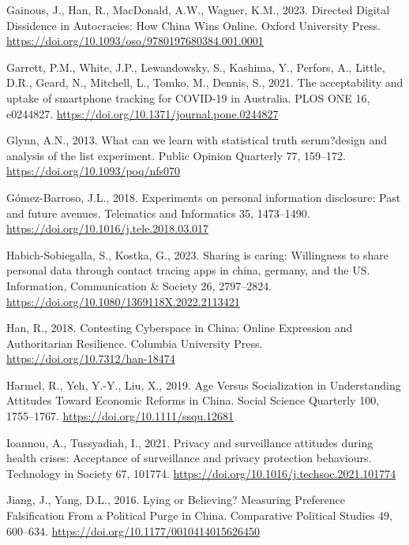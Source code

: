 \documentclass[
  letterpaper,
  DIV=11,
  numbers=noendperiod]{scrartcl}
\newlength{\cslhangindent}
\newenvironment{CSLReferences}[2] %
 {\begin{list}{}{%
  \setlength{\itemindent}{0pt}
  \setlength{\leftmargin}{0pt}
  \setlength{\parsep}{0pt}
  \ifodd #1
   \setlength{\leftmargin}{\cslhangindent}
   \setlength{\itemindent}{-1\cslhangindent}
  \fi
  \setlength{\itemsep}{#2\baselineskip}}}
 {\end{list}}
\begin{document}
\begin{CSLReferences}{1}{0}
Gainous, J., Han, R., MacDonald, A.W., Wagner, K.M., 2023. Directed
Digital Dissidence in Autocracies: How China Wins Online. Oxford
University Press.
\url{https://doi.org/10.1093/oso/9780197680384.001.0001}

Garrett, P.M., White, J.P., Lewandowsky, S., Kashima, Y., Perfors, A.,
Little, D.R., Geard, N., Mitchell, L., Tomko, M., Dennis, S., 2021. The
acceptability and uptake of smartphone tracking for COVID-19 in
Australia. PLOS ONE 16, e0244827.
\url{https://doi.org/10.1371/journal.pone.0244827}

Glynn, A.N., 2013. What can we learn with statistical truth serum?design
and analysis of the list experiment. Public Opinion Quarterly 77,
159--172. \url{https://doi.org/10.1093/poq/nfs070}

Gómez-Barroso, J.L., 2018. Experiments on personal information
disclosure: Past and future avenues. Telematics and Informatics 35,
1473--1490. \url{https://doi.org/10.1016/j.tele.2018.03.017}

Habich-Sobiegalla, S., Kostka, G., 2023. Sharing is caring: Willingness
to share personal data through contact tracing apps in china, germany,
and the US. Information, Communication \& Society 26, 2797--2824.
\url{https://doi.org/10.1080/1369118X.2022.2113421}

Han, R., 2018. Contesting Cyberspace in China: Online Expression and
Authoritarian Resilience. Columbia University Press.
\url{https://doi.org/10.7312/han-18474}

Harmel, R., Yeh, Y.-Y., Liu, X., 2019. Age Versus Socialization in
Understanding Attitudes Toward Economic Reforms in China. Social Science
Quarterly 100, 1755--1767. \url{https://doi.org/10.1111/ssqu.12681}

Ioannou, A., Tussyadiah, I., 2021. Privacy and surveillance attitudes
during health crises: Acceptance of surveillance and privacy protection
behaviours. Technology in Society 67, 101774.
\url{https://doi.org/10.1016/j.techsoc.2021.101774}

Jiang, J., Yang, D.L., 2016. Lying or Believing? Measuring Preference
Falsification From a Political Purge in China. Comparative Political
Studies 49, 600--634. \url{https://doi.org/10.1177/0010414015626450}


\end{CSLReferences}
\end{document}
